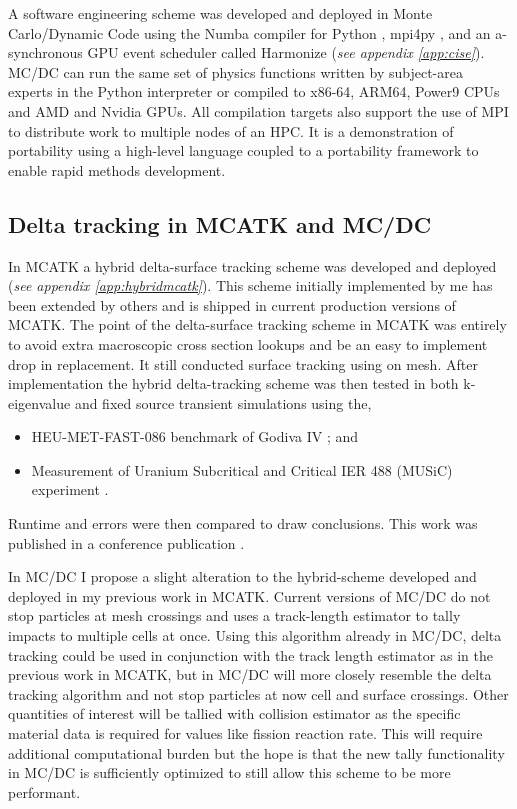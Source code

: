 A software engineering scheme was developed and deployed in Monte Carlo/Dynamic Code \cite{morgan_monte_2024} using the Numba compiler for Python \cite{lam_numba_2015}, mpi4py \cite{mpi4py_2021}, and an a-synchronous GPU event scheduler called Harmonize \cite{brax2023} (\textit{see appendix \ref{app:cise}}).
MC/DC can run the same set of physics functions written by subject-area experts in the Python interpreter or compiled to x86-64, ARM64, Power9 CPUs and AMD and Nvidia GPUs.
All compilation targets also support the use of MPI to distribute work to multiple nodes of an HPC.
It is a demonstration of portability using a high-level language coupled to a portability framework to enable rapid methods development.

\subsection{Delta tracking in MCATK and MC/DC}

In MCATK a hybrid delta-surface tracking scheme was developed and deployed (\textit{see appendix \ref{app:hybridmcatk}}).
This scheme initially implemented by me has been extended by others and is shipped in current production versions of MCATK.
The point of the delta-surface tracking scheme in MCATK was entirely to avoid extra macroscopic cross section lookups and be an easy to implement drop in replacement.
It still conducted surface tracking using on mesh.
After implementation the hybrid delta-tracking scheme was then tested in both k-eigenvalue and fixed source transient simulations using the,
\begin{itemize}
    \item HEU-MET-FAST-086 benchmark of Godiva IV \cite{godivaiv2021}; and
    \item Measurement of Uranium Subcritical and Critical IER 488 (MUSiC) experiment \cite{music2021}.
\end{itemize}
Runtime and errors were then compared to draw conclusions.
This work was published in a conference publication \cite{morgan2023oci}.

In MC/DC I propose a slight alteration to the hybrid-scheme developed and deployed in my previous work in MCATK.
Current versions of MC/DC do not stop particles at mesh crossings and uses a track-length estimator to tally impacts to multiple cells at once.
Using this algorithm already in MC/DC, delta tracking could be used in conjunction with the track length estimator as in the previous work in MCATK, but in MC/DC will more closely resemble the delta tracking algorithm and not stop particles at now cell and surface crossings.
Other quantities of interest will be tallied with collision estimator as the specific material data is required for values like fission reaction rate.
This will require additional computational burden but the hope is that the new tally functionality in MC/DC is sufficiently optimized to still allow this scheme to be more performant.


